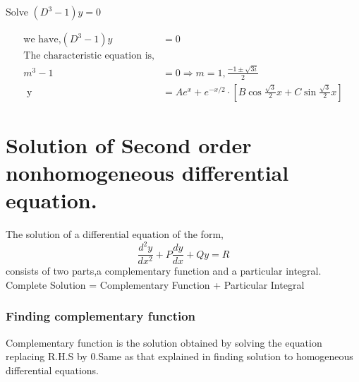 \begin{exercise}
	Solve $\left(D^{3}-1\right) y=0$
\end{exercise}
\begin{answer}
	\begin{align*}
	\text{we have,}\left(D^{3}-1\right) y&=0\\
	\text{The characteristic equation is,}\\
	m^{3}-1&=0 \Rightarrow m=1, \frac{-1 \pm \sqrt{3 i}}{2}\\\text { y }&=A e^{x}+e^{-x / 2} \cdot\left[B \cos \frac{\sqrt{3}}{2} x+C \sin \frac{\sqrt{3}}{2} x\right]
	\end{align*}
\end{answer}\newpage

\section{Solution of Second order nonhomogeneous differential equation.}
The solution of a differential equation of the form,$$\frac{d^{2} y}{d x^{2}}+P \frac{d y}{d x}+Q y=R$$ consists of two parts,a complementary function and a particular integral.
\\Complete Solution = Complementary Function + Particular Integral
\begin{center}
\end{center}
\subsubsection{Finding complementary function}
Complementary function is the solution obtained by solving the equation replacing R.H.S by 0.Same as that explained in finding solution to homogeneous differential equations.
